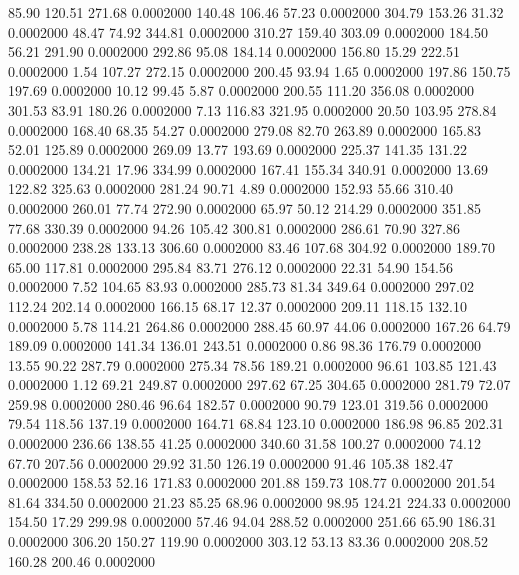   85.90  120.51  271.68   0.0002000
 140.48  106.46   57.23   0.0002000
 304.79  153.26   31.32   0.0002000
  48.47   74.92  344.81   0.0002000
 310.27  159.40  303.09   0.0002000
 184.50   56.21  291.90   0.0002000
 292.86   95.08  184.14   0.0002000
 156.80   15.29  222.51   0.0002000
   1.54  107.27  272.15   0.0002000
 200.45   93.94    1.65   0.0002000
 197.86  150.75  197.69   0.0002000
  10.12   99.45    5.87   0.0002000
 200.55  111.20  356.08   0.0002000
 301.53   83.91  180.26   0.0002000
   7.13  116.83  321.95   0.0002000
  20.50  103.95  278.84   0.0002000
 168.40   68.35   54.27   0.0002000
 279.08   82.70  263.89   0.0002000
 165.83   52.01  125.89   0.0002000
 269.09   13.77  193.69   0.0002000
 225.37  141.35  131.22   0.0002000
 134.21   17.96  334.99   0.0002000
 167.41  155.34  340.91   0.0002000
  13.69  122.82  325.63   0.0002000
 281.24   90.71    4.89   0.0002000
 152.93   55.66  310.40   0.0002000
 260.01   77.74  272.90   0.0002000
  65.97   50.12  214.29   0.0002000
 351.85   77.68  330.39   0.0002000
  94.26  105.42  300.81   0.0002000
 286.61   70.90  327.86   0.0002000
 238.28  133.13  306.60   0.0002000
  83.46  107.68  304.92   0.0002000
 189.70   65.00  117.81   0.0002000
 295.84   83.71  276.12   0.0002000
  22.31   54.90  154.56   0.0002000
   7.52  104.65   83.93   0.0002000
 285.73   81.34  349.64   0.0002000
 297.02  112.24  202.14   0.0002000
 166.15   68.17   12.37   0.0002000
 209.11  118.15  132.10   0.0002000
   5.78  114.21  264.86   0.0002000
 288.45   60.97   44.06   0.0002000
 167.26   64.79  189.09   0.0002000
 141.34  136.01  243.51   0.0002000
   0.86   98.36  176.79   0.0002000
  13.55   90.22  287.79   0.0002000
 275.34   78.56  189.21   0.0002000
  96.61  103.85  121.43   0.0002000
   1.12   69.21  249.87   0.0002000
 297.62   67.25  304.65   0.0002000
 281.79   72.07  259.98   0.0002000
 280.46   96.64  182.57   0.0002000
  90.79  123.01  319.56   0.0002000
  79.54  118.56  137.19   0.0002000
 164.71   68.84  123.10   0.0002000
 186.98   96.85  202.31   0.0002000
 236.66  138.55   41.25   0.0002000
 340.60   31.58  100.27   0.0002000
  74.12   67.70  207.56   0.0002000
  29.92   31.50  126.19   0.0002000
  91.46  105.38  182.47   0.0002000
 158.53   52.16  171.83   0.0002000
 201.88  159.73  108.77   0.0002000
 201.54   81.64  334.50   0.0002000
  21.23   85.25   68.96   0.0002000
  98.95  124.21  224.33   0.0002000
 154.50   17.29  299.98   0.0002000
  57.46   94.04  288.52   0.0002000
 251.66   65.90  186.31   0.0002000
 306.20  150.27  119.90   0.0002000
 303.12   53.13   83.36   0.0002000
 208.52  160.28  200.46   0.0002000
